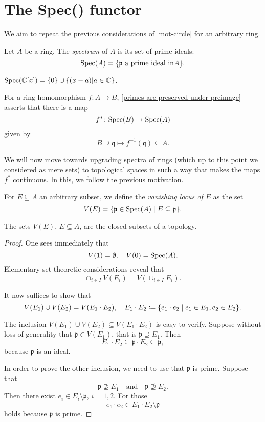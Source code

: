 \section{The Spec() functor}
We aim to repeat the previous considerations of \cref{mot-circle} for an arbitrary ring.

\begin{df}
Let $A$ be a ring. The \textit{spectrum} of $A$ is its set of prime ideals:
\[\text{Spec}(A) = \{ \mathfrak p \text{ a prime ideal in} A \}.\]
\end{df}

\begin{example}
  $\text{Spec}(\mathbb C [x]) =  \{0\} \cup \{ (x-a) | a \in \mathbb C \}$.
\end{example}

For a ring homomorphism $f \colon A \to B$, \cref{primes are preserved under preimage} asserts that there is a map
\[f^* \colon \text{Spec}(B) \to \text{Spec}(A)\]
given by 
\[B \supseteq \mathfrak q \mapsto f^{-1}(\mathfrak q) \subseteq A.\]

We will now move towards upgrading spectra of rings (which up to this point we considered as mere sets) to topological spaces in such a way that makes the maps $f^*$ continuous. In this, we follow the previous motivation.

\begin{df}
For $E \subseteq A$ an arbitrary subset, we define the \textit{vanishing locus of $E$} as the set
\[V(E) = \{ \mathfrak p \in \text{Spec}(A) \mathrel{|} E \subseteq \mathfrak p \} .\]
\end{df}

\begin{prop}
  \label{zariski-prop}
  The sets $V(E)$, $E \subseteq A$, are the closed subsets of a topology.
\end{prop}

\begin{proof}
  One sees immediately that
  \[ V(1) = \emptyset, \quad V(0) = \text{Spec}(A).\]
  Elementary set-theoretic considerations reveal that
  \[\cap_{i \in I} V(E_i) = V(\cup_{i \in I} E_i).\]

  It now suffices to show that
\[ V(E_1) \cup V(E_2) = V(E_1 \cdot E_2), \quad E_1 \cdot E_2 \coloneqq \{ e_1 \cdot e_2 \mathrel{|} e_1 \in E_1, e_2 \in E_2 \}.\]

The inclusion $V(E_1) \cup V(E_2) \subseteq V(E_1 \cdot E_2)$ is easy to verify. Suppose without loss of generality that $\mathfrak p \in V(E_1)$, that is $\mathfrak p \supseteq E_1$. Then
\[ E_1 \cdot E_2 \subseteq \mathfrak p \cdot E_2 \subseteq \mathfrak p,\]
because $\mathfrak p$ is an ideal.

In order to prove the other inclusion, we need to use that $\mathfrak p$ is prime. Suppose that
\[ \mathfrak p \not\supseteq E_1 \quad \text{and} \quad \mathfrak p \not\supseteq E_2.\]
Then there exist $e_i \in E_i \setminus \mathfrak p$, $i=1,2$. For those \[ e_1 \cdot e_2 \in E_1 \cdot E_2 \setminus \mathfrak p\]
holds because $\mathfrak p$ is prime.
\end{proof}

